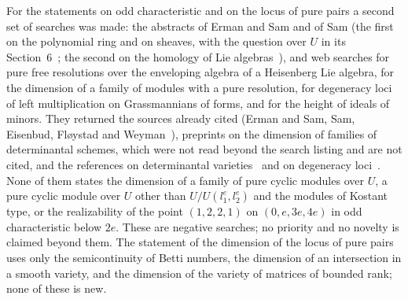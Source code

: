\documentclass[11pt]{article}
\theoremstyle{definition}
\theoremstyle{remark}
\begin{document}
For the statements on odd characteristic and on the locus of pure pairs a second set of searches was made: the abstracts of Erman and Sam and of Sam (the first on the polynomial ring and on sheaves, with the question over $U$ in its Section~6~\cite{ES16}; the second on the homology of Lie algebras~\cite{Sam15}), and web searches for pure free resolutions over the enveloping algebra of a Heisenberg Lie algebra, for the dimension of a family of modules with a pure resolution, for degeneracy loci of left multiplication on Grassmannians of forms, and for the height of ideals of minors. They returned the sources already cited (Erman and Sam, Sam, Eisenbud, Fl{\o}ystad and Weyman~\cite{EFW11}), preprints on the dimension of families of determinantal schemes, which were not read beyond the search listing and are not cited, and the references on determinantal varieties~\cite{BV} and on degeneracy loci~\cite{Fulton}. None of them states the dimension of a family of pure cyclic modules over $U$, a pure cyclic module over $U$ other than $U/U(l_1^e,l_2^e)$ and the modules of Kostant type, or the realizability of the point $(1,2,2,1)$ on $(0,e,3e,4e)$ in odd characteristic below $2e$. These are negative searches; no priority and no novelty is claimed beyond them. The statement of the dimension of the locus of pure pairs uses only the semicontinuity of Betti numbers, the dimension of an intersection in a smooth variety, and the dimension of the variety of matrices of bounded rank; none of these is new.
\end{document}
